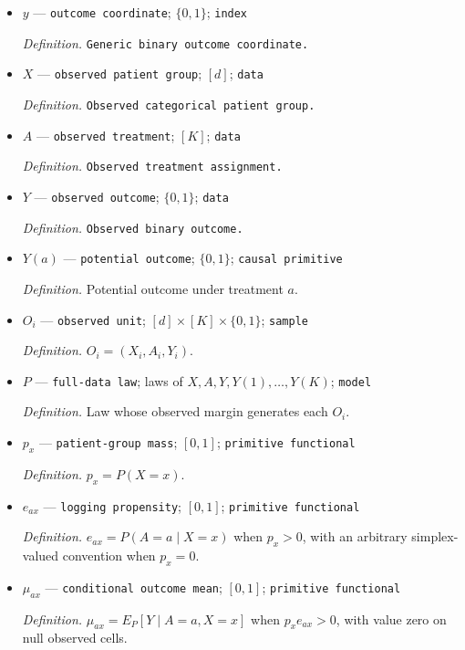 \documentclass{article}
\begin{document}
\begin{itemize}
  \par\smallskip\noindent\emph{Definition.} \texttt{Generic index for one of the two treatment blocks in the binary embedding.}
  \item \(y\) --- \texttt{outcome coordinate}; \(\{0,1\}\); \texttt{index}
  \par\smallskip\noindent\emph{Definition.} \texttt{Generic binary outcome coordinate.}
  \item \(X\) --- \texttt{observed patient group}; \([d]\); \texttt{data}
  \par\smallskip\noindent\emph{Definition.} \texttt{Observed categorical patient group.}
  \item \(A\) --- \texttt{observed treatment}; \([K]\); \texttt{data}
  \par\smallskip\noindent\emph{Definition.} \texttt{Observed treatment assignment.}
  \item \(Y\) --- \texttt{observed outcome}; \(\{0,1\}\); \texttt{data}
  \par\smallskip\noindent\emph{Definition.} \texttt{Observed binary outcome.}
  \item \(Y(a)\) --- \texttt{potential outcome}; \(\{0,1\}\); \texttt{causal primitive}
  \par\smallskip\noindent\emph{Definition.} Potential outcome under treatment \(a\).
  \item \(O_i\) --- \texttt{observed unit}; \([d]\times[K]\times\{0,1\}\); \texttt{sample}
  \par\smallskip\noindent\emph{Definition.} \(O_i=(X_i,A_i,Y_i)\).
  \item \(P\) --- \texttt{full-\allowbreak{}data law}; laws of \(X,A,Y,Y(1),\ldots,Y(K)\); \texttt{model}
  \par\smallskip\noindent\emph{Definition.} Law whose observed margin generates each \(O_i\).
  \item \(p_x\) --- \texttt{patient-\allowbreak{}group mass}; \([0,1]\); \texttt{primitive functional}
  \par\smallskip\noindent\emph{Definition.} \(p_x=P(X=x)\).
  \item \(e_{ax}\) --- \texttt{logging propensity}; \([0,1]\); \texttt{primitive functional}
  \par\smallskip\noindent\emph{Definition.} \(e_{ax}=P(A=a\mid X=x)\) when \(p_x>0\), with an arbitrary simplex-valued convention when \(p_x=0\).
  \item \(\mu_{ax}\) --- \texttt{conditional outcome mean}; \([0,1]\); \texttt{primitive functional}
  \par\smallskip\noindent\emph{Definition.} \(\mu_{ax}=E_P[Y\mid A=a,X=x]\) when \(p_xe_{ax}>0\), with value zero on null observed cells.

\end{itemize}
\end{document}
